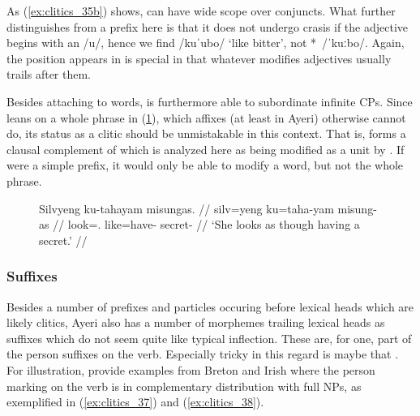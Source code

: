 As (\ref{ex:clitics_35b}) shows,  can have wide scope over
conjuncts. What further distinguishes  from a prefix here is
that it does not undergo crasis if the adjective begins with an /u/, hence we find
 /kuˈubo/ `like bitter', not *\,
/ˈkuːbo/. Again, the position  appears in is special in that
whatever modifies adjectives usually trails after them.

\label{clitics_preverb_ku}
Besides attaching to words,  is furthermore able to subordinate
infinite CPs. Since  leans on a whole phrase in
(\ref{ex:clitics_36}), which affixes (at least in Ayeri) otherwise cannot do,
its status as a clitic should be unmistakable in this context. That is,
 forms a clausal
complement of  which is analyzed here as
being modified as a unit by . If  were a simple
prefix, it would only be able to modify a word, but not the whole phrase.

\begin{figure}
\ex\label{ex:clitics_36}\begingl
	\gla Silvyeng ku-tahayam misungas. //
	\glb silv=yeng ku=taha-yam misung-as //
	\glc look=\TsgF{}.\Aarg{} like=have-\Ptcp{} secret-\Parg{} //
	\glft `She looks as though having a secret.' //
\endgl\xe
\end{figure}

\subsubsection{Suffixes}
\label{subsubsec:suffixes}

\label{clitics_postverb_person}
Besides a number of prefixes and particles occuring before lexical heads which
are likely clitics, Ayeri also has a number of morphemes trailing lexical heads
as suffixes which do not seem quite like typical inflection. These are, for
one, part of the person suffixes on the verb. Especially tricky in this regard
is maybe that  \parencites[144]{spencerluis2012}[also
compare][101]{corbett2006}. For illustration, \citet{spencerluis2012} provide
examples from Breton and Irish where the person marking on the verb is in
complementary distribution with full NPs, as exemplified in
(\ref{ex:clitics_37}) and (\ref{ex:clitics_38}).

